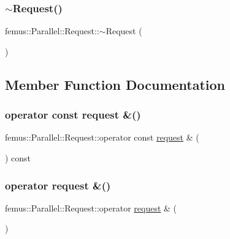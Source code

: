 \subsubsection{\texorpdfstring{$\sim$\+Request()}{~Request()}}
{\footnotesize\ttfamily femus\+::\+Parallel\+::\+Request\+::$\sim$\+Request (\begin{DoxyParamCaption}{ }\end{DoxyParamCaption})\hspace{0.3cm}{\ttfamily [inline]}}



\subsection{Member Function Documentation}
\mbox{\label{classfemus_1_1_parallel_1_1_request_afb63d51b8a02ca0d3620d91daa50e07a}} 
\subsubsection{\texorpdfstring{operator const request \&()}{operator const request \&()}}
{\footnotesize\ttfamily femus\+::\+Parallel\+::\+Request\+::operator const \mbox{\hyperlink{structfemus_1_1_parallel_1_1request}{request}} \& (\begin{DoxyParamCaption}{ }\end{DoxyParamCaption}) const\hspace{0.3cm}{\ttfamily [inline]}}

\mbox{\label{classfemus_1_1_parallel_1_1_request_acfeca7685161f89c4ecf9211220ba542}} 
\subsubsection{\texorpdfstring{operator request \&()}{operator request \&()}}
{\footnotesize\ttfamily femus\+::\+Parallel\+::\+Request\+::operator \mbox{\hyperlink{structfemus_1_1_parallel_1_1request}{request}} \& (\begin{DoxyParamCaption}{ }\end{DoxyParamCaption})\hspace{0.3cm}{\ttfamily [inline]}}


